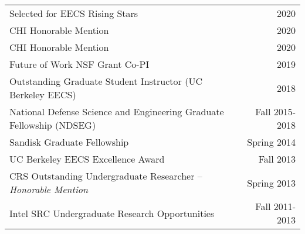 \begin{longtable}{Xr}
	Selected for EECS Rising Stars & 2020 \\
	CHI Honorable Mention & 2020 \\
	CHI Honorable Mention & 2020 \\
	Future of Work NSF Grant Co-PI & 2019 \\
	Outstanding Graduate Student Instructor (UC Berkeley EECS) & 2018 \\
	National Defense Science and Engineering Graduate Fellowship (NDSEG) & Fall 2015-2018 \\
	Sandisk Graduate Fellowship & Spring 2014 \\
	UC Berkeley EECS Excellence Award & Fall 2013 \\
	CRS Outstanding Undergraduate Researcher -- \textit{Honorable Mention} & Spring 2013 \\
	Intel SRC Undergraduate Research Opportunities & Fall 2011-2013 \\
\end{longtable}